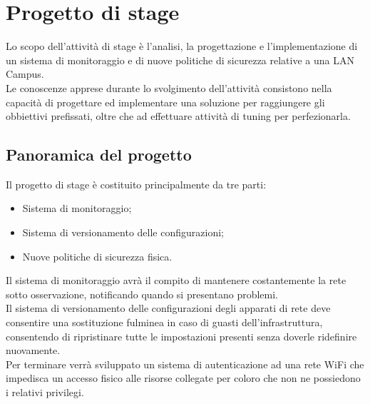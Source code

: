 \documentclass[Tesi.tex]{subfiles}
\begin{document}
\chapter{Progetto di stage}
Lo scopo dell'attività di stage è l’analisi, la progettazione e l'implementazione di un sistema di monitoraggio e di nuove politiche di sicurezza relative a una LAN Campus. \\
Le conoscenze apprese durante lo svolgimento dell'attività consistono nella capacità di progettare ed implementare una soluzione per raggiungere gli obbiettivi prefissati, oltre che ad effettuare attività di tuning per perfezionarla.


\section{Panoramica del progetto}

Il progetto di stage è costituito principalmente da tre parti:
\begin{itemize}
	\item Sistema di monitoraggio;
	\item Sistema di versionamento delle configurazioni;
	\item Nuove politiche di sicurezza fisica.
\end{itemize}

Il sistema di monitoraggio avrà il compito di mantenere costantemente la rete sotto osservazione, notificando quando si presentano problemi. \\
Il sistema di versionamento delle configurazioni degli apparati di rete deve consentire una sostituzione fulminea in caso di guasti dell'infrastruttura, consentendo di ripristinare tutte le impostazioni presenti senza doverle ridefinire nuovamente. \\
Per terminare verrà sviluppato un sistema di autenticazione ad una rete WiFi che impedisca un accesso fisico alle risorse collegate per coloro che non ne possiedono i relativi privilegi.\\
\end{document}

